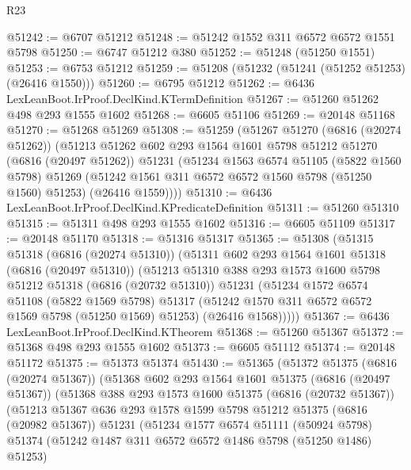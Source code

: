 \begin{lexlean}{R23}
\begin{coremodule}
@51242 := @6707 @51212
@51248 := @51242 @1552 @311 @6572 @6572 @1551 @5798
@51250 := @6747 @51212 @380
@51252 := @51248 (@51250 @1551)
@51253 := @6753 @51212
@51259 := @51208 (@51232 (@51241 (@51252 @51253) (@26416 @1550)))
@51260 := @6795 @51212
@51262 := @6436 LexLeanBoot.IrProof.DeclKind.KTermDefinition
@51267 := @51260 @51262 @498 @293 @1555 @1602
@51268 := @6605 @51106
@51269 := @20148 @51168
@51270 := @51268 @51269
@51308 := @51259
    (@51267
      @51270
      (@6816 (@20274 @51262))
      (@51213
        @51262
        @602
        @293
        @1564
        @1601
        @5798
        @51212
        @51270
        (@6816 (@20497 @51262))
        @51231
        (@51234
          @1563
          @6574
          @51105
          (@5822 @1560 @5798)
          @51269
          (@51242 @1561 @311 @6572 @6572 @1560 @5798 (@51250 @1560) @51253)
          (@26416 @1559))))
@51310 := @6436 LexLeanBoot.IrProof.DeclKind.KPredicateDefinition
@51311 := @51260 @51310
@51315 := @51311 @498 @293 @1555 @1602
@51316 := @6605 @51109
@51317 := @20148 @51170
@51318 := @51316 @51317
@51365 := @51308
    (@51315
      @51318
      (@6816 (@20274 @51310))
      (@51311
        @602
        @293
        @1564
        @1601
        @51318
        (@6816 (@20497 @51310))
        (@51213
          @51310
          @388
          @293
          @1573
          @1600
          @5798
          @51212
          @51318
          (@6816 (@20732 @51310))
          @51231
          (@51234
            @1572
            @6574
            @51108
            (@5822 @1569 @5798)
            @51317
            (@51242 @1570 @311 @6572 @6572 @1569 @5798 (@51250 @1569) @51253)
            (@26416 @1568)))))
@51367 := @6436 LexLeanBoot.IrProof.DeclKind.KTheorem
@51368 := @51260 @51367
@51372 := @51368 @498 @293 @1555 @1602
@51373 := @6605 @51112
@51374 := @20148 @51172
@51375 := @51373 @51374
@51430 := @51365
    (@51372
      @51375
      (@6816 (@20274 @51367))
      (@51368
        @602
        @293
        @1564
        @1601
        @51375
        (@6816 (@20497 @51367))
        (@51368
          @388
          @293
          @1573
          @1600
          @51375
          (@6816 (@20732 @51367))
          (@51213
            @51367
            @636
            @293
            @1578
            @1599
            @5798
            @51212
            @51375
            (@6816 (@20982 @51367))
            @51231
            (@51234
              @1577
              @6574
              @51111
              (@50924 @5798)
              @51374
              (@51242 @1487 @311 @6572 @6572 @1486 @5798 (@51250 @1486) @51253)

\end{coremodule}
\end{lexlean}
